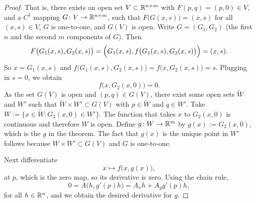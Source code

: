 \begin{proof}
That is, there exists an open set $V \subset {\mathbb{R}}^{n+m}$ with
$F(p,q) = (p,0) \in V$,
and a  $C^1$
mapping $G \colon V \to {\mathbb{R}}^{n+m}$, such that $F\bigl(G(x,s)\bigr) = (x,s)$ for
all $(x,s) \in V$, $G$ is one-to-one, and $G(V)$ is open. %
Write $G = (G_1,G_2)$ (the first $n$ and the second $m$ components of $G$).
Then
\begin{equation*}
F\bigl(G_1(x,s),G_2(x,s)\bigr) = \Bigl(G_1(x,s),f\bigl(G_1(x,s),G_2(x,s) \bigr)\Bigr)
= (x,s) .
\end{equation*}
So $x = G_1(x,s)$ and $f\bigl(G_1(x,s),G_2(x,s)\bigr) = f\bigl(x,G_2(x,s)\bigr) = s$.
Plugging in $s=0$, we obtain
\begin{equation*}
f\bigl(x,G_2(x,0)\bigr) = 0 .
\end{equation*}
As the set $G(V)$ is open and $(p,q) \in G(V)$,
there exist some open sets
$\widetilde{W}$ and $W'$ such that $\widetilde{W} \times W' \subset G(V)$ with $p
\in \widetilde{W}$ and
$q \in W'$.
Take $W := \bigl\{ x \in \widetilde{W} : G_2(x,0) \in W' \bigr\}$.
The function that takes $x$ to $G_2(x,0)$ is continuous and therefore $W$
is open.
Define
$g \colon W \to {\mathbb{R}}^m$ by $g(x) := G_2(x,0)$, which is the $g$ in the theorem.
The fact that $g(x)$ is the unique point in $W'$ follows because $W \times
W' \subset G(V)$ and $G$ is one-to-one.

Next differentiate
\begin{equation*}
x\mapsto f\bigl(x,g(x)\bigr) ,
\end{equation*}
at $p$,
which is the zero map, so its derivative is zero.
Using the chain rule,
\begin{equation*}
0 = A\bigl(h,g'(p)h\bigr) = A_xh + A_yg'(p)h ,
\end{equation*}
for all $h \in {\mathbb{R}}^{n}$,
and we obtain the desired derivative for $g$.
\end{proof}

